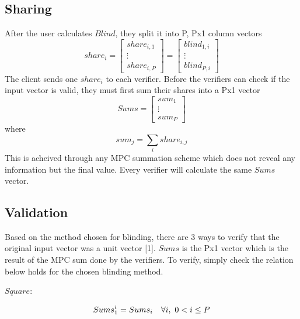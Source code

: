 \documentclass[conference]{IEEEtran}
\begin{document}
\subsection{Sharing}
After the user calculates $\textit{Blind}$, they split it into P, Px1 column vectors 
\begin{equation*}
share_i =
\begin{bmatrix}
	share_{i,1} \\
	\vdots \\
	share_{i,P}
\end{bmatrix}
= \begin{bmatrix}
	blind_{1,i} \\
	\vdots \\
	blind_{P,i}
\end{bmatrix}
\end{equation*}
The client sends one $share_i$ to each verifier. Before the verifiers can check if the input vector is valid, they must first sum their shares into a Px1 vector
\begin{equation*}
	Sums =
	\begin{bmatrix}
		sum_1\\
		\vdots\\
		sum_P 
	\end{bmatrix}
\end{equation*}
where
\begin{equation*}
	sum_j = \sum_i share_{i,j}
\end{equation*}
This is acheived through any MPC summation scheme which does not reveal any information but the final value. Every verifier will calculate the same $Sums$ vector.\\


\subsection{Validation}
Based on the method chosen for blinding, there are 3 ways to verify that the original input vector was a unit vector [1]. $Sums$ is the Px1 vector which is the result of the MPC sum done by the verifiers. To verify, simply check the relation below holds for the chosen blinding method.\\

\begin{flushleft}
$Square$:\\
\end{flushleft}
\begin{equation*}
Sums_1^i = Sums_i~~~ \forall i,~0 < i \leq P\\
\end{equation*}
\end{document}
